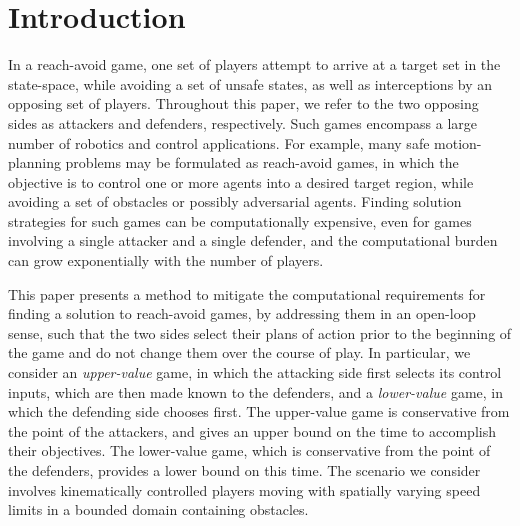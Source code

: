 \section{Introduction}

In a reach-avoid game, one set of players attempt to arrive at a target set in the state-space, while avoiding a set of unsafe states, as well as interceptions by an opposing set of players.  Throughout this paper, we refer to the two opposing sides as attackers and defenders, respectively. 
Such games encompass a large number of robotics and control applications.
For example, many safe motion-planning problems may be formulated as reach-avoid games, in which the objective is to control one or more agents into a desired target region, while avoiding a set of obstacles or possibly adversarial agents.
Finding solution strategies for such games can be computationally expensive, even for games involving a single attacker and a single defender, and the computational burden can grow exponentially with the number of players. 

This paper presents a method to mitigate the computational requirements for finding a solution to reach-avoid games, by addressing them in an open-loop sense, such that the two sides select their plans of action prior to the beginning of the game and do not change them over the course of play. 
In particular, we consider an \emph{upper-value} game, in which the attacking side first selects its control inputs, which are then made known to the defenders, and a \emph{lower-value} game, in which the defending side chooses first.
The upper-value game is conservative from the point of the attackers, and gives an upper bound on the time to accomplish their objectives.  The lower-value game, which is conservative from the point of the defenders, provides a lower bound on this time.
The scenario we consider involves kinematically controlled players moving with spatially varying speed limits in a bounded domain containing obstacles.

